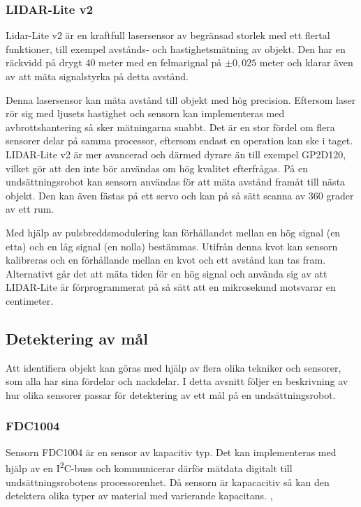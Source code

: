 \documentclass[11pt]{article}
\begin{document}
\begin{flushleft}
\subsubsection{LIDAR-Lite v2}
Lidar-Lite v2 är en kraftfull lasersensor av begränsad storlek med ett flertal funktioner, till exempel avstånds- och hastighetsmätning av objekt. Den har en räckvidd på drygt 40 meter med en felmarignal på $\pm 0,025$ meter och klarar även av att mäta signalstyrka på detta avstånd. \cite{Lidar}

Denna lasersensor kan mäta avstånd till objekt med hög precision. Eftersom laser rör sig med ljusets hastighet och sensorn kan implementeras med avbrottshantering så sker mätningarna snabbt. Det är en stor fördel om flera sensorer delar på samma processor, eftersom endast en operation kan ske i taget. LIDAR-Lite v2 är mer avancerad och därmed dyrare än till exempel GP2D120, vilket gör att den inte bör användas om hög kvalitet efterfrågas. På en undsättningsrobot kan sensorn användas för att mäta avstånd framåt till nästa objekt. Den kan även fästas på ett servo och kan på så sätt scanna av 360 grader av ett rum. \cite{Lidar}

Med hjälp av pulsbreddsmodulering kan förhållandet mellan en hög signal (en etta) och en låg signal (en nolla) bestämmas. Utifrån denna kvot kan sensorn kalibreras och en förhållande mellan en kvot och ett avstånd kan tas fram. Alternativt går det att mäta tiden för en hög signal och använda sig av att LIDAR-Lite är förprogrammerat på så sätt att en mikrosekund motsvarar en centimeter. \cite{Lidar}


\subsection{Detektering av mål}
Att identifiera objekt kan göras med hjälp av flera olika tekniker och sensorer, som alla har sina fördelar och nackdelar. I detta avsnitt följer en beskrivning av hur olika sensorer passar för detektering av ett mål på en undsättningsrobot.


\subsubsection{FDC1004} %
Sensorn FDC1004 är en sensor av kapacitiv typ. Det kan implementeras med hjälp av en I\textsuperscript{2}C-buss och kommunicerar därför mätdata digitalt till undsättningsrobotens processorenhet. Då sensorn är kapacacitiv så kan den detektera olika typer av material med varierande kapacitans. \cite{Texas}, \cite{Texas2}


\end{flushleft}
\end{document}
